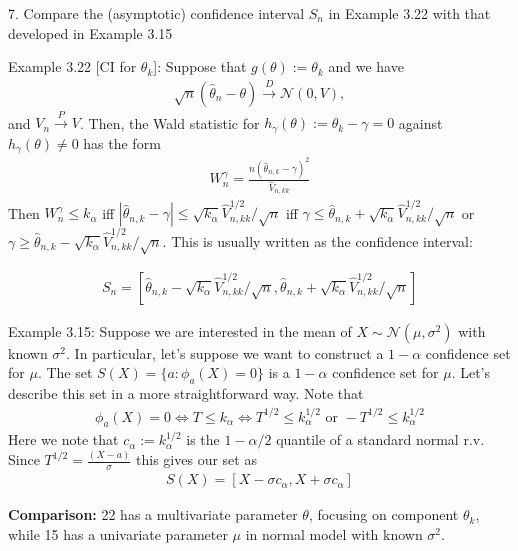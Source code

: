 \documentclass[10pt]{article}
\begin{document}
\newpage 

7. Compare the (asymptotic) confidence interval $S_n $ in Example 3.22 with that developed in Example 3.15

Example 3.22 [CI for $\theta_k $]: Suppose that $g(\theta) := \theta_k $ and we have 
\begin{gather*}
    \sqrt{n}(\hat{\theta}_n - \theta) \xrightarrow{D} \mathcal{N}(0, V),
\end{gather*}
and $V_n\xrightarrow{P} V $. Then, the Wald statistic for $h_\gamma(\theta) := \theta_k - \gamma = 0 $ against $h_\gamma(\theta) \neq 0 $ has the form
\begin{gather*}
    W_n^\gamma = \frac{n(\hat{\theta}_{n, k} - \gamma)^2}{\hat{V}_{n, kk}}
\end{gather*}
Then $W_n^\gamma \le k_\alpha $ iff $|\hat{\theta}_{n, k} - \gamma| \le \sqrt{k_\alpha}\hat{V}_{n, kk}^{1 / 2} / \sqrt{n}$ iff $\gamma \le \hat{\theta}_{n, k} + \sqrt{k_\alpha}\hat{V}_{n, kk}^{1 / 2} / \sqrt{n}$ or $\gamma \ge \hat{\theta}_{n, k} - \sqrt{k_\alpha}\hat{V}_{n, kk}^{1 / 2} / \sqrt{n}$. This is usually written as the confidence interval:


\begin{gather*}
    S_n = \left[\hat{\theta}_{n, k} - \sqrt{k_\alpha}\hat{V}_{n, kk}^{1 / 2} / \sqrt{n}, \hat{\theta}_{n, k} + \sqrt{k_\alpha}\hat{V}_{n, kk}^{1 / 2} / \sqrt{n}\right]
\end{gather*}

Example 3.15: Suppose we are interested in the mean of $X \sim \mathcal{N}(\mu, \sigma^2)$ with known $\sigma^2 $. In particular, let's suppose we want to construct a $1 - \alpha $ confidence set for $\mu $. The set $S(X) = \{a : \phi_a (X) = 0\}$ is a $1 - \alpha $ confidence set for $\mu $. Let's describe this set in a more straightforward way. Note that 
\begin{gather*}
    \phi_a(X) = 0 \iff T \le k_\alpha \iff T^{1 / 2} \le k_\alpha^{1 / 2} \text{ or } -T^{1 / 2} \le k_\alpha^{1 / 2}
\end{gather*}
Here we note that $c_\alpha := k_\alpha^{1 / 2}$ is the $1 - \alpha / 2 $ quantile of a standard normal r.v. Since $T^{1 / 2} = \frac{(X - a)}{\sigma}$ this gives our set as 
\begin{gather*}
    S(X) = [X - \sigma c_\alpha, X + \sigma c_\alpha]
\end{gather*}

\textbf{Comparison: }22 has a multivariate parameter $\theta $, focusing on component $\theta_k $, while 15 has a univariate parameter $\mu $ in normal model with known $\sigma^2 $. 
\end{document}
